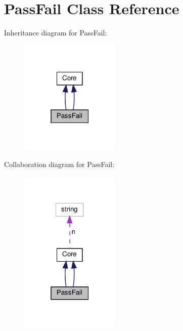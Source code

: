 \hypertarget{classPassFail}{}\section{Pass\+Fail Class Reference}
\label{classPassFail}


Inheritance diagram for Pass\+Fail\+:
\nopagebreak
\begin{figure}[H]
\begin{center}
\leavevmode
\includegraphics[width=135pt]{classPassFail__inherit__graph}
\end{center}
\end{figure}


Collaboration diagram for Pass\+Fail\+:
\nopagebreak
\begin{figure}[H]
\begin{center}
\leavevmode
\includegraphics[width=135pt]{classPassFail__coll__graph}
\end{center}
\end{figure}
